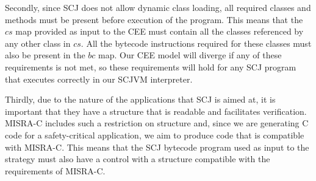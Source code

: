 Secondly, since SCJ does not allow dynamic class loading, all required
classes and methods must be present before execution of the program.
This means that the $cs$ map provided as input to the CEE must contain
all the classes referenced by any other class in $cs$.
All the bytecode instructions required for these classes must also be
present in the $bc$ map.
Our CEE model will diverge if any of these requirements is not met, so
these requirements will hold for any SCJ program that executes
correctly in our SCJVM interpreter.

Thirdly, due to the nature of the applications that SCJ is aimed at,
it is important that they have a structure that is readable and
facilitates verification.
MISRA-C includes such a restriction on structure and, since we are
generating C code for a safety-critical application, we aim to produce
code that is compatible with MISRA-C.
This means that the SCJ bytecode program used as input to the strategy
must also have a control with a structure compatible with the
requirements of MISRA-C.


